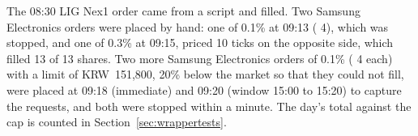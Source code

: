  The 08:30 LIG Nex1 order came from a script and filled. Two Samsung Electronics orders were placed by hand: one of 0.1\% at 09:13 ( 4), which was stopped, and one of 0.3\% at 09:15, priced 10 ticks on the opposite side, which filled 13 of 13 shares. Two more Samsung Electronics orders of 0.1\% ( 4 each) with a limit of KRW~151,800, 20\% below the market so that they could not fill, were placed at 09:18 (immediate) and 09:20 (window 15:00 to 15:20) to capture the requests, and both were stopped within a minute. The day's total against the cap is counted in Section~\ref{sec:wrappertests}.
